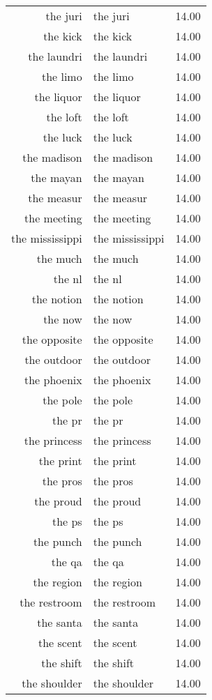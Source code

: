 \begin{table}[ht]
\begin{tabular}{rlr}
  the juri & the juri & 14.00 \\ 
  the kick & the kick & 14.00 \\ 
  the laundri & the laundri & 14.00 \\ 
  the limo & the limo & 14.00 \\ 
  the liquor & the liquor & 14.00 \\ 
  the loft & the loft & 14.00 \\ 
  the luck & the luck & 14.00 \\ 
  the madison & the madison & 14.00 \\ 
  the mayan & the mayan & 14.00 \\ 
  the measur & the measur & 14.00 \\ 
  the meeting & the meeting & 14.00 \\ 
  the mississippi & the mississippi & 14.00 \\ 
  the much & the much & 14.00 \\ 
  the nl & the nl & 14.00 \\ 
  the notion & the notion & 14.00 \\ 
  the now & the now & 14.00 \\ 
  the opposite & the opposite & 14.00 \\ 
  the outdoor & the outdoor & 14.00 \\ 
  the phoenix & the phoenix & 14.00 \\ 
  the pole & the pole & 14.00 \\ 
  the pr & the pr & 14.00 \\ 
  the princess & the princess & 14.00 \\ 
  the print & the print & 14.00 \\ 
  the pros & the pros & 14.00 \\ 
  the proud & the proud & 14.00 \\ 
  the ps & the ps & 14.00 \\ 
  the punch & the punch & 14.00 \\ 
  the qa & the qa & 14.00 \\ 
  the region & the region & 14.00 \\ 
  the restroom & the restroom & 14.00 \\ 
  the santa & the santa & 14.00 \\ 
  the scent & the scent & 14.00 \\ 
  the shift & the shift & 14.00 \\ 
  the shoulder & the shoulder & 14.00 \\ 

\end{tabular}
\end{table}
